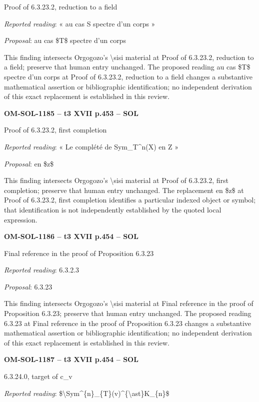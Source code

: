Proof of 6.3.23.2, reduction to a field\par
\emph{Reported reading}: « au cas S spectre d'un corps »\par
\emph{Proposal}: au cas \$T\$ spectre d'un corps\par
This finding intersects Orgogozo's \textbackslash{}sisi material at Proof of 6.3.23.2, reduction to a field; preserve that human entry unchanged. The proposed reading au cas \$T\$ spectre d'un corps at Proof of 6.3.23.2, reduction to a field changes a substantive mathematical assertion or bibliographic identification; no independent derivation of this exact replacement is established in this review.\par
\par\noindent\textbf{OM-SOL-1185 -- t3 XVII p.453 -- SOL}\par
Proof of 6.3.23.2, first completion\par
\emph{Reported reading}: « Le complété de Sym\_T\textasciicircum{}n(X) en Z »\par
\emph{Proposal}: en \$z\$\par
This finding intersects Orgogozo's \textbackslash{}sisi material at Proof of 6.3.23.2, first completion; preserve that human entry unchanged. The replacement en \$z\$ at Proof of 6.3.23.2, first completion identifies a particular indexed object or symbol; that identification is not independently established by the quoted local expression.\par
\par\noindent\textbf{OM-SOL-1186 -- t3 XVII p.454 -- SOL}\par
Final reference in the proof of Proposition 6.3.23\par
\emph{Reported reading}: 6.3.2.3\par
\emph{Proposal}: 6.3.23\par
This finding intersects Orgogozo's \textbackslash{}sisi material at Final reference in the proof of Proposition 6.3.23; preserve that human entry unchanged. The proposed reading 6.3.23 at Final reference in the proof of Proposition 6.3.23 changes a substantive mathematical assertion or bibliographic identification; no independent derivation of this exact replacement is established in this review.\par
\par\noindent\textbf{OM-SOL-1187 -- t3 XVII p.454 -- SOL}\par
6.3.24.0, target of c\_v\par
\emph{Reported reading}: \$\textbackslash{}Sym\textasciicircum{}\{n\}\_\{T\}(v)\textasciicircum{}\{\textbackslash{}ast\}K\_\{n\}\$\par
